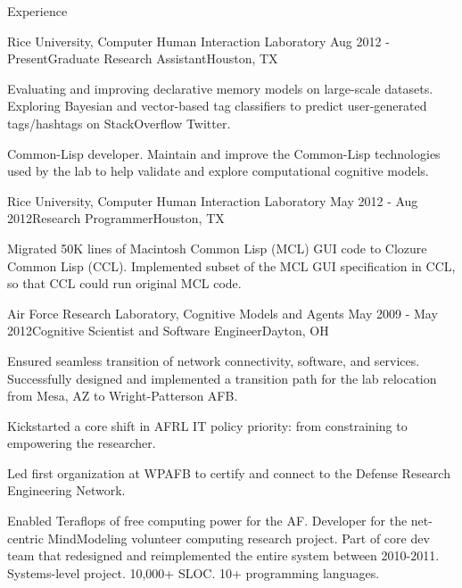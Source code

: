 
\begin{rSection}{Experience}

  \begin{rSubsection}{Rice University, Computer Human Interaction Laboratory}
    {Aug 2012 - Present}{Graduate Research Assistant}{Houston, TX}
  \item Evaluating and improving declarative memory models on large-scale datasets.
    Exploring Bayesian and vector-based tag classifiers to predict user-generated tags/hashtags on StackOverflow Twitter.
  \item Common-Lisp developer.
    Maintain and improve the Common-Lisp technologies used by the lab to help validate and explore computational cognitive models.
  \end{rSubsection}

  \begin{rSubsection}{Rice University, Computer Human Interaction Laboratory}
    {May 2012 - Aug 2012}{Research Programmer}{Houston, TX}
  \item Migrated 50K lines of Macintosh Common Lisp (MCL) GUI code to Clozure Common Lisp (CCL).
    Implemented subset of the MCL GUI specification in CCL, so that CCL could run original MCL code.
  \end{rSubsection}

  \begin{rSubsection}{Air Force Research Laboratory, Cognitive Models and Agents}
    {May 2009 - May 2012}{Cognitive Scientist and Software Engineer}{Dayton, OH}
  \item
    Ensured seamless transition of network connectivity, software, and services.
    Successfully designed and implemented a transition path for the lab relocation from Mesa, AZ to Wright-Patterson AFB. 
  \item 
    Kickstarted a core shift in AFRL IT policy priority: from constraining to empowering the researcher.
  \item
    Led first organization at WPAFB to certify and connect to the Defense Research Engineering Network.
  \item 
    Enabled Teraflops of free computing power for the AF.
    Developer for the net-centric MindModeling volunteer computing research project.
    Part of core dev team that redesigned and reimplemented the entire system between 2010-2011.
    Systems-level project. 10,000+ SLOC. 10+ programming languages. 
  \end{rSubsection}


\end{rSection}
